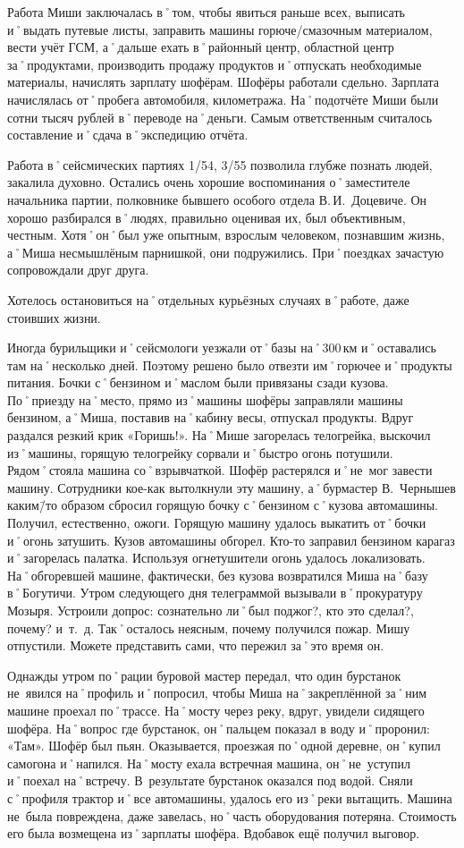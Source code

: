 Работа Миши заключалась в˚том, чтобы явиться раньше всех, выписать и˚выдать путевые листы, заправить машины горюче\-/смазочным материалом, вести учёт ГСМ, а˚дальше ехать в˚районный центр, областной центр за˚продуктами, производить продажу продуктов и˚отпускать необходимые материалы, начислять зарплату шофёрам. Шофёры работали сдельно. Зарплата начислялась от˚пробега автомобиля, километража. На˚подотчёте Миши были сотни тысяч рублей в˚переводе на˚деньги. Самым ответственным считалось составление и˚сдача в˚экспедицию отчёта.

Работа в˚сейсмических партиях 1/54, 3/55 позволила глубже познать людей, закалила духовно. Остались очень хорошие воспоминания о˚заместителе начальника партии, полковнике бывшего особого отдела В.\,И.~Доцевиче. Он хорошо разбирался в˚людях, правильно оценивая их, был объективным, честным. Хотя˚он˚был уже опытным, взрослым человеком, познавшим жизнь, а˚Миша несмышлёным парнишкой, они подружились. При˚поездках зачастую сопровождали друг друга.

Хотелось остановиться на˚отдельных курьёзных случаях в˚работе, даже стоивших жизни. 

Иногда бурильщики и˚сейсмологи уезжали от˚базы на˚300\,км и˚оставались там на˚несколько дней. Поэтому решено было отвезти им˚горючее и˚продукты питания. Бочки с˚бензином и˚маслом были привязаны сзади кузова. По˚приезду на˚место, прямо из˚машины шофёры заправляли машины бензином, а˚Миша, поставив на˚кабину весы, отпускал продукты. Вдруг раздался резкий крик «Горишь!». На˚Мише загорелась телогрейка, выскочил из˚машины, горящую телогрейку сорвали и˚быстро огонь потушили. Рядом˚стояла машина со˚взрывчаткой. Шофёр растерялся и˚не~мог завести машину. Сотрудники кое-как вытолкнули эту машину, а˚бурмастер В.~Чернышев каким\=/то образом сбросил горящую бочку с˚бензином с˚кузова автомашины. Получил, естественно, ожоги. Горящую машину удалось выкатить от˚бочки и˚огонь затушить. Кузов автомашины обгорел. Кто-то заправил бензином карагаз и˚загорелась палатка. Используя огнетушители огонь удалось локализовать. На˚обгоревшей машине, фактически, без кузова возвратился Миша на˚базу в˚Богутичи. Утром следующего дня телеграммой вызывали в˚прокуратуру Мозыря. Устроили допрос: сознательно ли˚был поджог?, кто это сделал?, почему? и~т.~д. Так˚осталось неясным, почему получился пожар. Мишу отпустили. Можете представить сами, что пережил за˚это время он.

Однажды утром по˚рации буровой мастер передал, что один бурстанок не~явился на˚профиль и˚попросил, чтобы Миша на˚закреплённой за˚ним машине проехал по˚трассе. На˚мосту через реку, вдруг, увидели сидящего шофёра. На˚вопрос где бурстанок, он˚пальцем показал в воду и˚проронил: «Там». Шофёр был пьян. Оказывается, проезжая по˚одной деревне, он˚купил самогона и˚напился. На˚мосту ехала встречная машина, он˚не~уступил и˚поехал на˚встречу. В~результате бурстанок оказался под водой. Сняли с˚профиля трактор и˚все автомашины, удалось его из˚реки вытащить. Машина не~была повреждена, даже завелась, но˚часть оборудования потеряна. Стоимость его была возмещена из˚зарплаты шофёра. Вдобавок ещё получил выговор. 

